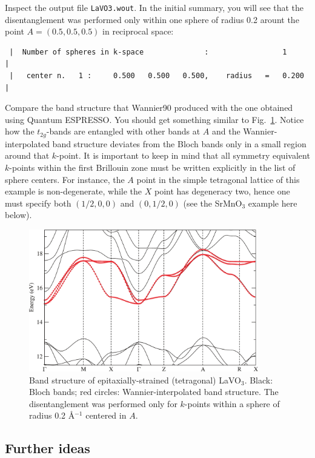 \documentclass[a4paper,11pt,twoside]{article}
\begin{document}
Inspect the output file {\tt LaVO3.wout}. In the initial summary, you
will see that the disentanglement was performed only within one sphere
of radius 0.2 arount the point $A=(0.5, 0.5, 0.5)$ in reciprocal space:
\begin{verbatim}
 |  Number of spheres in k-space              :                 1             |
 |   center n.   1 :     0.500   0.500   0.500,    radius   =   0.200         |
\end{verbatim}

Compare the band structure that Wannier90 produced with the one
obtained using Quantum ESPRESSO. You should get something similar to Fig.~\ref{fig:lavo3}.
Notice how the $t_{2g}$-bands are entangled with other bands at $A$ and the Wannier-interpolated band structure deviates from the Bloch bands only in a small region around that $k$-point.
It is important to keep in mind that all symmetry equivalent $k$-points within the first Brillouin zone must be written explicitly in the list of sphere centers. 
For instance, the $A$ point in the simple tetragonal lattice of this example is non-degenerate, while the $X$ point has degeneracy two, hence one must specify both $(1/2,0,0)$ and $(0,1/2,0)$ (see the SrMnO$_3$ example here below).

\begin{figure}[h]
\begin{center}
\includegraphics[width=10cm]{LaVO3}
\caption{Band structure of epitaxially-strained (tetragonal) LaVO$_3$. Black: Bloch bands; red circles: Wannier-interpolated band structure. The disentanglement was performed only for $k$-points within a sphere of radius 0.2 \AA$^{-1}$ centered in $A$.} 
\label{fig:lavo3}
\end{center}
\end{figure}

\subsection*{Further ideas}
\end{document}
